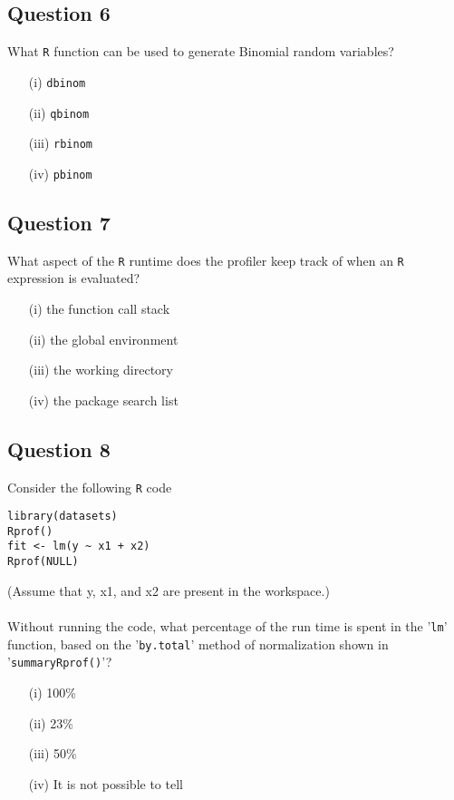 \documentclass[11pt]{article} %
\begin{document}
\subsection*{Question 6}
What \texttt{R} function can be used to generate Binomial random variables?

\begin{itemize}
\item[(i)] \texttt{dbinom}
\item[(ii)] \texttt{qbinom}
\item[(iii)] \texttt{rbinom}
\item[(iv)] \texttt{pbinom}
\end{itemize}
\newpage
\subsection*{Question 7}
What aspect of the \texttt{R} runtime does the profiler keep track of when an \texttt{R} expression is evaluated?

\begin{itemize}
\item[(i)] the function call stack
\item[(ii)] the global environment
\item[(iii)] the working directory
\item[(iv)] the package search list
\end{itemize}
\newpage
\subsection*{Question 8}
Consider the following \texttt{R} code
\begin{framed}
\begin{verbatim}
library(datasets)
Rprof()
fit <- lm(y ~ x1 + x2)
Rprof(NULL)
\end{verbatim}
\end{framed}
\noindent (Assume that y, x1, and x2 are present in the workspace.) \\ \\ Without running the code, what percentage of the run time is spent in the '\texttt{lm}' function, based on the '\texttt{by.total}' method of normalization shown in '\texttt{summaryRprof()}'?

\begin{itemize}
\item[(i)] 100\%
\item[(ii)] 23\%
\item[(iii)] 50\%
\item[(iv)] It is not possible to tell
\end{itemize}
\newpage
\end{document}
